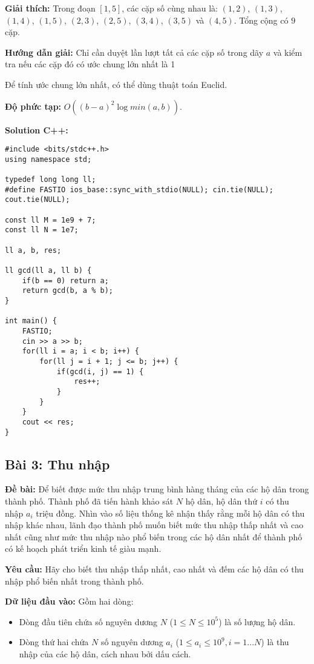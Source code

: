 \documentclass[12pt]{scrartcl}  %
\begin{document}
\textbf{Giải thích:}
Trong đoạn $[1, 5]$, các cặp số cùng nhau là: $(1, 2)$, $(1, 3)$, $(1, 4)$, $(1, 5)$, $(2, 3)$, $(2, 5)$, $(3, 4)$, $(3, 5)$ và $(4, 5)$. Tổng cộng có $9$ cặp.

\textbf{Hướng dẫn giải:} Chỉ cần duyệt lần lượt tất cả các cặp số trong dãy $a$ và kiểm tra
nếu các cặp đó có ước chung lớn nhất là 1

Để tính ước chung lớn nhất, có thể dùng thuật toán Euclid.

\textbf{Độ phức tạp:} $O((b - a)^2 \log min(a, b))$.

\textbf{Solution C++:}
\begin{lstlisting}
#include <bits/stdc++.h>
using namespace std;

typedef long long ll;
#define FASTIO ios_base::sync_with_stdio(NULL); cin.tie(NULL); cout.tie(NULL);

const ll M = 1e9 + 7;
const ll N = 1e7;

ll a, b, res;

ll gcd(ll a, ll b) {
    if(b == 0) return a;
    return gcd(b, a % b);
}

int main() {
    FASTIO;
    cin >> a >> b;
    for(ll i = a; i < b; i++) {
        for(ll j = i + 1; j <= b; j++) {
            if(gcd(i, j) == 1) {
                res++;
            }
        }
    }
    cout << res;
}
\end{lstlisting}

\subsection{Bài 3: Thu nhập}
\textbf{Đề bài:}
Để biết được mức thu nhập trung bình hàng tháng của các hộ dân trong thành phố. Thành phố đã tiến hành khảo sát $N$ hộ dân, hộ dân thứ $i$ có thu nhập $a_i$ triệu đồng. Nhìn vào số liệu thống kê nhận thấy rằng mỗi hộ dân có thu nhập khác nhau, lãnh đạo thành phố muốn biết mức thu nhập thấp nhất và cao nhất cũng như mức thu nhập nào phổ biến trong các hộ dân nhất để thành phố có kế hoạch phát triển kinh tế giàu mạnh.

\textbf{Yêu cầu:}
Hãy cho biết thu nhập thấp nhất, cao nhất và đếm các hộ dân có thu nhập phổ biến nhất trong thành phố.

\textbf{Dữ liệu đầu vào:}
Gồm hai dòng:
\begin{itemize}
    \item Dòng đầu tiên chứa số nguyên dương $N$ ($1 \leq N \leq 10^5$) là số lượng hộ dân.
    \item Dòng thứ hai chứa $N$ số nguyên dương $a_i$ ($1 \leq a_i \leq 10^9, i = 1 ... N$) là thu nhập của các hộ dân, cách nhau bởi dấu cách.
\end{itemize}
\end{document}
